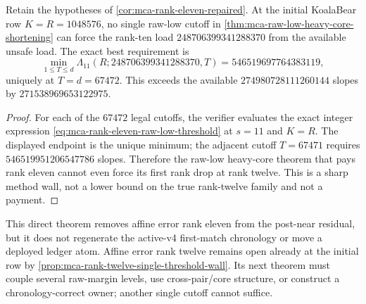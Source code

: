\documentclass[11pt,a4paper]{amsart}
\numberwithin{equation}{section}
\theoremstyle{remark}
\begin{document}
\begin{proposition}
\label{prop:mca-rank-twelve-single-threshold-wall}
Retain the hypotheses of \cref{cor:mca-rank-eleven-repaired}.  At the initial
KoalaBear row \(K=R=1048576\), no single raw-low cutoff in
\cref{thm:mca-raw-low-heavy-core-shortening} can force the rank-ten load
\(248706399341288370\) from the available unsafe load.  The exact best
requirement is
\[
 \min_{1\le T\le d}
 \Lambda_{11}(R;248706399341288370,T)
 =546519697764383119,
 \tag{R12W}\label{eq:mca-rank-twelve-single-threshold-wall}
\]
uniquely at \(T=d=67472\).  This exceeds the available
\(274980728111260144\) slopes by \(271538969653122975\).
\end{proposition}

\begin{proof}
For each of the \(67472\) legal cutoffs, the verifier evaluates the exact
integer expression \eqref{eq:mca-rank-eleven-raw-low-threshold} at \(s=11\)
and \(K=R\).  The displayed endpoint is the unique minimum; the adjacent
cutoff \(T=67471\) requires \(546519951206547786\) slopes.  Therefore the
raw-low heavy-core theorem that pays rank eleven cannot even force its first
rank drop at rank twelve.  This is a sharp method wall, not a lower bound on
the true rank-twelve family and not a payment.
\end{proof}

\begin{remark}
\label{rem:mca-rank-eleven-repair-scope}
This direct theorem removes affine error rank eleven from the post-near
residual, but it does not regenerate the active-v4 first-match chronology or
move a deployed ledger atom.  Affine error rank twelve remains open already
at the initial row by
\cref{prop:mca-rank-twelve-single-threshold-wall}.  Its next theorem must
couple several raw-margin levels, use cross-pair/core structure, or construct
a chronology-correct owner; another single cutoff cannot suffice.
\end{remark}
\end{document}
